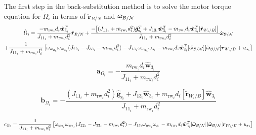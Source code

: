 The first step in the back-substitution method is to solve the motor torque equation for $\dot{\Omega}_i$ in terms of $\ddot{\bm{r}}_{B/N}$ and $\dot{\bm\omega}_{\cal B/N}$
\begin{multline}
\dot{\Omega}_i
= \frac{-m_{\text{rw}_i} d_i \hat{\bm{w}}_{3_i}^T }{J_{11_i} + m_{\text{rw}_i} d_i^2}\ddot{\bm{r}}_{B/N} + \frac{-\big[(J_{11_i} + m_{\text{rw}_i} d_i^2)\hat{\bm g}_{\text{s}_i}^T  + J_{13_i}\hat{\bm w}_{3_i}^T -m_{\text{rw}_i} d_i \hat{\bm{w}}_{3_i}^T [\tilde{\bm r}_{W_i/B}]\big]}{J_{11_i} + m_{\text{rw}_i} d_i^2}\dot{\bm\omega}_{\cal B/N} 
\\
+\frac{1}{J_{11_i} + m_{\text{rw}_i} d_i^2}\left[\omega_{w_{2_i}} \omega_{w_{3_i}} (J_{22_i} - J_{33_i} - m_{\text{rw}_i} d_i^2
)-J_{13_i} \omega_{w_{2_i}}\omega_{s_i} -m_{\text{rw}_i} d_i \hat{\bm{w}}_{3_i}^T [\tilde{\bm\omega}_{\cal B/N}] [\tilde{\bm\omega}_{\cal B/N}] \bm r_{W_i/B} + u_{s_i} \right]
\label{eq:motorTorqueFinal2}
\end{multline}

\begin{equation}
\bm{a}_{\Omega_i} = -\frac{m_{\text{rw}_i} d_i \hat{\bm{w}}_{3_i} }{J_{11_i} + m_{\text{rw}_i} d_i^2}
\end{equation}

\begin{equation}
\bm{b}_{\Omega_i} = -\frac{(J_{11_i} + m_{\text{rw}_i} d_i^2)\hat{\bm g}_{\text{s}_i}  + J_{13_i}\hat{\bm w}_{3_i} +m_{\text{rw}_i} d_i  [\tilde{\bm r}_{W_i/B}]\hat{\bm{w}}_{3_i}}{J_{11_i} + m_{\text{rw}_i} d_i^2}
\end{equation}

\begin{equation}
c_{\Omega_i} = \frac{1}{J_{11_i} + m_{\text{rw}_i} d_i^2}\left[\omega_{w_{2_i}} \omega_{w_{3_i}} (J_{22_i} - J_{33_i} - m_{\text{rw}_i} d_i^2
) - J_{13_i} \omega_{w_{2_i}}\omega_{s_i} -m_{\text{rw}_i} d_i \hat{\bm{w}}_{3_i}^T [\tilde{\bm\omega}_{\cal B/N}] [\tilde{\bm\omega}_{\cal B/N}] \bm r_{W_i/B} + u_{s_i} \right]
\end{equation}



